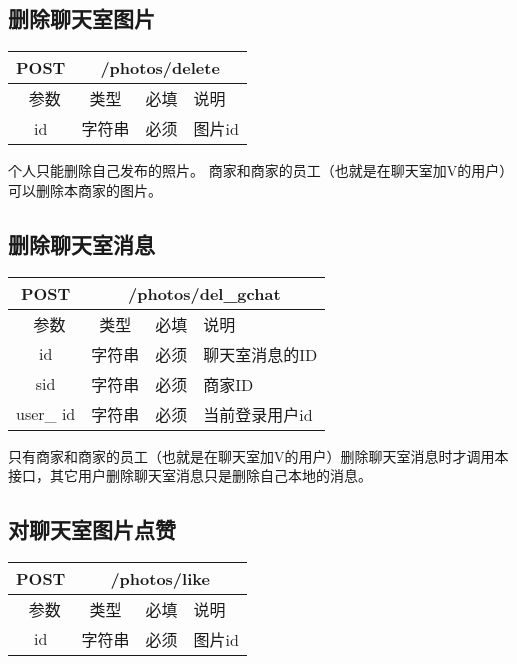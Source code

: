 \subsection{删除聊天室图片}

\begin{table}[H]
   \begin{center}
\begin{tabular}{|c|c|c|p{12cm}|}
\hline
POST & \multicolumn{3}{|c|}{/photos/delete} \\
\hline\hline
 \  参数  & 类型 & 必填 &  说明  \\
  \hline
 id  & 字符串 & 必须 & 图片id\\
\hline
\end{tabular}
   \end{center}
\end{table}
个人只能删除自己发布的照片。
商家和商家的员工（也就是在聊天室加V的用户）可以删除本商家的图片。

\subsection{删除聊天室消息}

\begin{table}[H]
   \begin{center}
\begin{tabular}{|c|c|c|p{12cm}|}
\hline
POST & \multicolumn{3}{|c|}{/photos/del\_gchat} \\
\hline\hline
 \  参数  & 类型 & 必填 &  说明  \\
  \hline
 id  & 字符串 & 必须 & 聊天室消息的ID\\
\hline
 sid  & 字符串 & 必须 & 商家ID\\
\hline
user_ id  & 字符串 & 必须 & 当前登录用户id\\
\hline

\end{tabular}
   \end{center}
\end{table}
只有商家和商家的员工（也就是在聊天室加V的用户）删除聊天室消息时才调用本接口，其它用户删除聊天室消息只是删除自己本地的消息。


\subsection{对聊天室图片点赞}

\begin{table}[H]
   \begin{center}
\begin{tabular}{|c|c|c|p{12cm}|}
\hline
POST & \multicolumn{3}{|c|}{/photos/like} \\
\hline\hline
 \  参数  & 类型 & 必填 &  说明  \\
  \hline
 id  & 字符串 & 必须 & 图片id\\
\hline
\end{tabular}
   \end{center}
\end{table}

